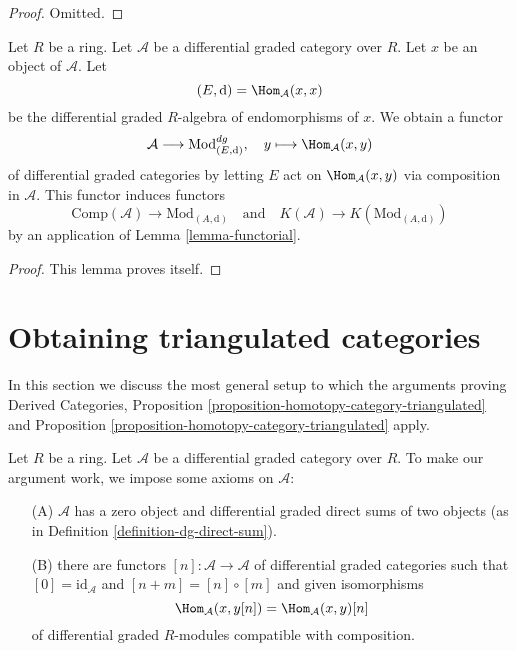 \begin{proof}
Omitted.
\end{proof}

\begin{lemma}
\label{lemma-construction}
Let $R$ be a ring. Let $\mathcal{A}$ be a differential graded category
over $R$. Let $x$ be an object of $\mathcal{A}$. Let
$$
(E, \text{d}) = \Hom_\mathcal{A}(x, x)
$$
be the differential graded $R$-algebra of endomorphisms of $x$.
We obtain a functor
$$
\mathcal{A} \longrightarrow \text{Mod}^{dg}_{(E, \text{d})},\quad
y \longmapsto \Hom_\mathcal{A}(x, y)
$$
of differential graded categories by letting $E$ act on
$\Hom_\mathcal{A}(x, y)$ via composition in $\mathcal{A}$.
This functor induces functors
$$
\text{Comp}(\mathcal{A}) \to \text{Mod}_{(A, \text{d})}
\quad\text{and}\quad
K(\mathcal{A}) \to K(\text{Mod}_{(A, \text{d})})
$$
by an application of Lemma \ref{lemma-functorial}.
\end{lemma}

\begin{proof}
This lemma proves itself.
\end{proof}









\section{Obtaining triangulated categories}
\label{section-review}

\noindent
In this section we discuss the most general setup to which the arguments
proving Derived Categories, Proposition
\ref{proposition-homotopy-category-triangulated} and
Proposition \ref{proposition-homotopy-category-triangulated} apply.

\medskip\noindent
Let $R$ be a ring. Let $\mathcal{A}$ be a differential graded category
over $R$. To make our argument work, we impose some axioms on $\mathcal{A}$:
\begin{enumerate}
\item[(A)] $\mathcal{A}$ has a zero object and differential
graded direct sums of two objects
(as in Definition \ref{definition-dg-direct-sum}).
\item[(B)] there are functors $[n] : \mathcal{A} \longrightarrow \mathcal{A}$
of differential graded categories such that
$[0] = \text{id}_\mathcal{A}$ and $[n + m] = [n] \circ [m]$
and given isomorphisms
$$
\Hom_\mathcal{A}(x, y[n]) = \Hom_\mathcal{A}(x, y)[n]
$$
of differential graded $R$-modules compatible with composition.
\end{enumerate}

